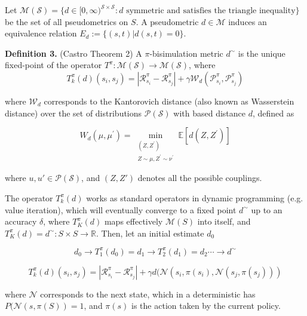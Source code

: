 Let $\mathcal{M(S)}= \{d \in [0, \infty)^{\mathcal{S} \times \mathcal{S}} : d \text{ symmetric and satisfies the triangle inequality}\}$ be the set of all pseudometrics on $S$. A pseudometric $d \in \mathcal{M}$ induces an equivalence relation $E_d := \{(s, t)|d(s, t) = 0\}$. \newline

\textbf{Definition 3.} (Castro \cite{castro2020scalable} Theorem 2) A $\pi$-bisimulation metric $d^\sim$ is the unique fixed-point of the operator $T^\pi : \mathcal{M(S)} \rightarrow \mathcal{M(S)}$, where 
\begin{equation}
    T^\pi_k(d)(s_i, s_j) = |\mathcal{R}^\pi_{s_i} - \mathcal{R}^\pi_{s_j}| + \gamma \mathcal{W}_d(\mathcal{P}^\pi_{s_i},\mathcal{P}^\pi_{s_j}) 
\end{equation}

where $\mathcal{W}_d$ corresponds to the Kantorovich distance (also known as Wasserstein distance) over the set of distributions $\mathcal{P}(\mathcal{S})$ with based distance $d$, defined as

\begin{equation}
W_d\left(\mu, \mu^{\prime}\right)=\min _{\substack{\left(Z, Z^{\prime}\right) \\ Z \sim \mu, Z^{\prime} \sim \nu^{\prime}}} \mathbb{E}\left[d\left(Z, Z^{\prime}\right)\right]
\end{equation}

where $u, u'\in \mathcal{P}(\mathcal{S})$, and $(Z,Z')$ denotes all the possible couplings.

The operator $T^\pi_k(d)$ works as standard operators in dynamic programming (e.g. value iteration), which will eventually converge to a fixed point $d^\sim$ up to an accuracy $\delta$, where $T^\pi_K(d)$ maps effectively $\mathcal{M}(S)$ into itself, and $T^\pi_K(d) = d^\sim : S \times S \rightarrow \mathbb{R}$. Then, let an initial estimate $d_0$

$$d_0 \rightarrow T^\pi_1(d_0) = d_1 \rightarrow T^\pi_2(d_1) = d_2 \cdots \rightarrow d^\sim$$

\begin{equation}
    T^\pi_k(d)(s_i, s_j) = |\mathcal{R}^\pi_{s_i} - \mathcal{R}^\pi_{s_j}| + \gamma d(\mathcal{N}(s_i,\pi(s_i),\mathcal{N}(s_j,\pi(s_j))) 
\end{equation}

where $\mathcal{N}$ corresponds to the next state, which in a deterministic has $P(\mathcal{N}(s,\pi(S)) = 1$, and $\pi(s)$ is the action taken by the current policy.















